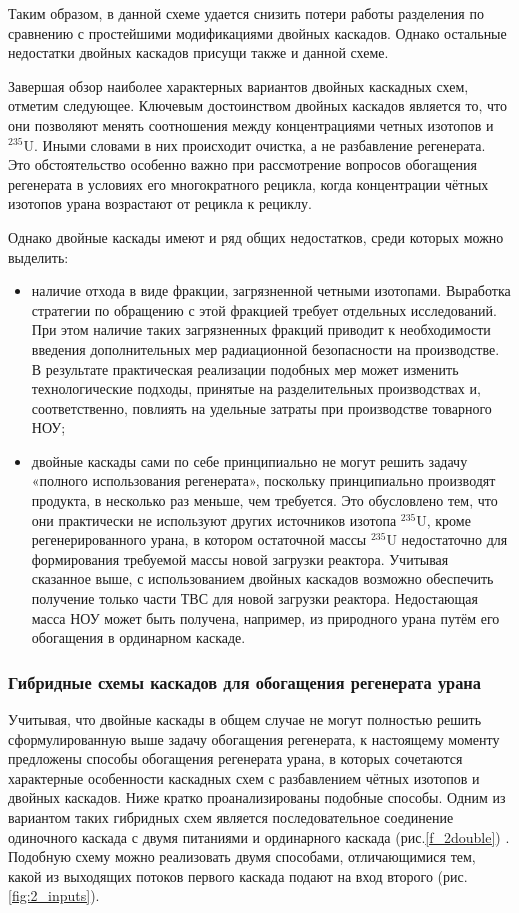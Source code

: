 Таким образом, в данной схеме удается снизить потери работы разделения по сравнению с простейшими модификациями двойных каскадов. Однако остальные недостатки двойных каскадов присущи также и данной схеме. 

Завершая обзор наиболее характерных вариантов двойных каскадных схем, отметим следующее. 
Ключевым достоинством двойных каскадов является то, что они позволяют менять соотношения между концентрациями четных изотопов и $^{235}$U. Иными словами в них происходит очистка, а не разбавление регенерата. Это обстоятельство особенно важно при рассмотрение вопросов обогащения регенерата в условиях его многократного рецикла, когда концентрации чётных изотопов урана возрастают от рецикла к рециклу.

Однако двойные каскады имеют и ряд общих недостатков, среди которых можно выделить:

\begin{itemize}
  \item наличие отхода в виде фракции, загрязненной четными изотопами. Выработка стратегии по обращению с этой фракцией требует отдельных исследований. При этом наличие таких загрязненных фракций приводит к необходимости введения дополнительных мер радиационной безопасности на производстве. В результате практическая реализации подобных мер может изменить технологические подходы, принятые на разделительных производствах и, соответственно, повлиять на удельные затраты при производстве товарного НОУ; 
  \item	двойные каскады сами по себе принципиально не могут решить задачу «полного использования регенерата», поскольку принципиально производят продукта, в несколько раз меньше, чем требуется. Это обусловлено тем, что они практически не используют других источников изотопа $^{235}$U, кроме регенерированного урана, в котором остаточной массы $^{235}$U недостаточно для формирования требуемой массы новой загрузки реактора. Учитывая сказанное выше, с использованием двойных каскадов возможно обеспечить получение только части ТВС для новой загрузки реактора. Недостающая масса НОУ может быть получена, например, из природного урана путём его обогащения в ординарном каскаде.
\end{itemize}


\subsubsection{Гибридные схемы каскадов для обогащения регенерата урана}

Учитывая, что двойные каскады в общем случае не могут полностью решить сформулированную выше задачу обогащения регенерата, к настоящему моменту предложены способы обогащения регенерата урана, в которых сочетаются характерные особенности каскадных схем с разбавлением чётных изотопов и двойных каскадов. Ниже кратко проанализированы подобные способы.
Одним из вариантом таких гибридных схем является последовательное соединение одиночного каскада с двумя питаниями и ординарного каскада (рис.\ref{f_2double}) \cite{palkinOchistkaRegenerirovannogoGeksaftorida2013}. Подобную схему можно реализовать двумя способами, отличающимися тем, какой из выходящих потоков первого каскада подают на вход второго (рис. \ref{fig:2_inputs}).

